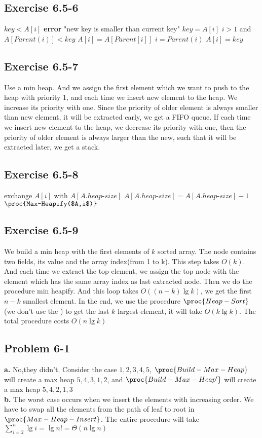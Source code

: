 \documentclass[12pt]{article}
\theoremstyle{definition}
\theoremstyle{remark}
\begin{document}
\subsection*{Exercise 6.5-6}
\begin{codebox}
\li \If $key<A[i]$
\li \quad \textbf{error} "new key is smaller than current key"
\li $key=A[i]$
\li \While $i>1$ and $A[Parent(i)]<key$
\li \quad $A[i]=A[Parent[i]]$
\li \quad $i=Parent(i)$
\li $A[i]=key$
\end{codebox}
\subsection*{Exercise 6.5-7}
Use a min heap. And we assign the first element which we want to push to the heap with priority 1, and each time we insert new element to the heap. We increase its priority with one. Since the priority of older element is always smaller than new element, it will be extracted early, we get a FIFO queue. If each time we insert new element to the heap, we decrease its priority with one, then the priority of older element is always larger than the new, such that it will be extracted later, we get a stack.
\subsection*{Exercise 6.5-8}
\begin{codebox}
\li exchange $A[i]$ with $A[A.heap\text{-}size]$
\li $A[A.heap\text{-}size]=A[A.heap\text{-}size]-1$
\li $\proc{Max-Heapify($A,i$)}$
\end{codebox}
\subsection*{Exercise 6.5-9}
We build a min heap with the first elements of $k$ sorted array. The node contains two fields, its value and the array index(from 1 to k). This step takes $O(k)$. And each time we extract the top element, we assign the top node with the element which has the same array index as last extracted node. Then we do the procedure min heapify. And this loop takes $O((n-k)\lg{k})$, we get the first $n-k$ smallest element. In the end, we use the procedure $\proc{Heap-Sort}$(we don't use the ) to get the last $k$ largest element, it will take $O(k\lg{k})$. The total procedure costs $O(n\lg{k})$
\subsection*{Problem 6-1}
\textbf{a.} No,they didn't. Consider the case $1,2,3,4,5$, $\proc{Build-Max-Heap}$ will create a max heap $5,4,3,1,2$, and $\proc{Build-Max-Heap'}$ will create a max heap $5,4,2,1,3$\\
\textbf{b.} The worst case occurs when we insert the elements with increasing order. We have to swap all the elements from the path of leaf to root in $\proc{Max-Heap-Insert}$. The entire procedure will take $\sum_{i=2}^n\lg{i}=\lg{n!}=\Theta(n\lg{n})$
\end{document}
